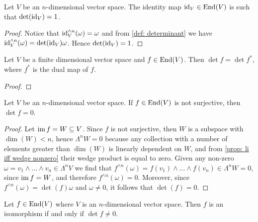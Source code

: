 \begin{proposition}\label{prop: id det}
    Let \(V\) be an \(n\)-dimensional vector space. The identity map \(\operatorname{id}_V \in
    \operatorname{End}(V)\) is such that \(\det(\operatorname{id}_V) = 1\).
\end{proposition}

\begin{proof}
    Notice that \(\operatorname{id}_V^{\wedge n}(\omega) = \omega\) and from \cref{def:
        determinant} we have \(\operatorname{id}_V^{\wedge n}(\omega) = \det(\operatorname{id}_V) \omega\). Hence
    \(\det(\operatorname{id}_V) = 1\).
\end{proof}

\begin{proposition}
    Let \(V\) be a finite dimensional vector space and \(f \in \operatorname{End}(V)\). Then
    \(\det f = \det f^*\), where \(f^*\) is the dual map of \(f\).
\end{proposition}

\begin{proof}

\end{proof}



\begin{lemma}\label{lem: not surjective 0 det}
    Let \(V\) be an \(n\)-dimensional vector space. If \(f \in \operatorname{End}(V)\) is not
    surjective, then \(\det f = 0\).
\end{lemma}

\begin{proof}
    Let \(\operatorname{im} f = W \subseteq V\). Since \(f\) is not surjective, then \(W\) is a
    subspace with \(\dim(W) < n\), hence \(\Lambda^n W = 0\) because any
    collection with a number of elements greater than \(\dim(W)\) is linearly
    dependent on \(W\), and from \cref{prop: li iff wedge nonzero} their wedge
    product is equal to zero. Given any non-zero \(\omega = v_1 \wedge \dots \wedge
    v_n \in \Lambda^n V\) we find that \(f^{\wedge n}(\omega) = f(v_1) \wedge
    \dots \wedge f(v_n) \in \Lambda^n W = 0\), since \(\operatorname{im} f = W\), and therefore
    \(f^{\wedge n}(\omega) = 0\). Moreover, since \(f^{\wedge n}(\omega) = \det(f)
    \omega\) and \(\omega \neq 0\), it follows that \(\det(f) = 0\).
\end{proof}

\begin{proposition}
    \label{prop: iso det}
    Let \(f \in \operatorname{End}(V)\) where \(V\) is an \(n\)-dimensional vector space. Then
    \(f\) is an isomorphism if and only if \(\det f \neq 0\).
\end{proposition}

